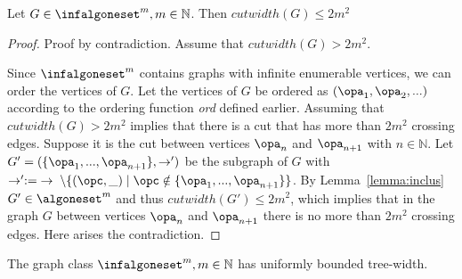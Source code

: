 \begin{theorem}
    Let $G\in\infalgoneset^m,m\in\mathbb{N}$. Then $cutwidth(G)\leq 2m^2$
\end{theorem}
\begin{proof}
    Proof by contradiction. Assume that $cutwidth(G)>2m^2$. 
    
    Since $\infalgoneset^m$ contains graphs with infinite enumerable vertices, we can order the vertices of $G$. Let the vertices of $G$ be ordered as $(\opa_1,\opa_2,...)$ according to the ordering function \textsl{ord} defined earlier. Assuming that $cutwidth(G)>2m^2$ implies that there is a cut that has more than $2m^2$ crossing edges. Suppose it is the cut between vertices $\opa_n$ and $\opa_{n+1}$ with $n\in\mathbb{N}$. Let $G'=(\{\opa_1,...,\opa_{n+1}\},\rightarrow')$ be the subgraph of $G$ with $\rightarrow':=\;\rightarrow\;\setminus\{(\opc,\_)\;|\;\opc\notin\{\opa_1,...,\opa_{n+1}\}\}$. By Lemma~\ref{lemma:inclus} $G'\in\algoneset^m$ and thus $cutwidth(G')\leq 2m^2$, which implies that in the graph $G$ between vertices $\opa_n$ and $\opa_{n+1}$ there is no more than $2m^2$ crossing edges. Here arises the contradiction.
\end{proof}

\begin{corollary}
    The graph class $\infalgoneset^m,m\in\mathbb{N}$ has uniformly bounded tree-width.
\end{corollary}